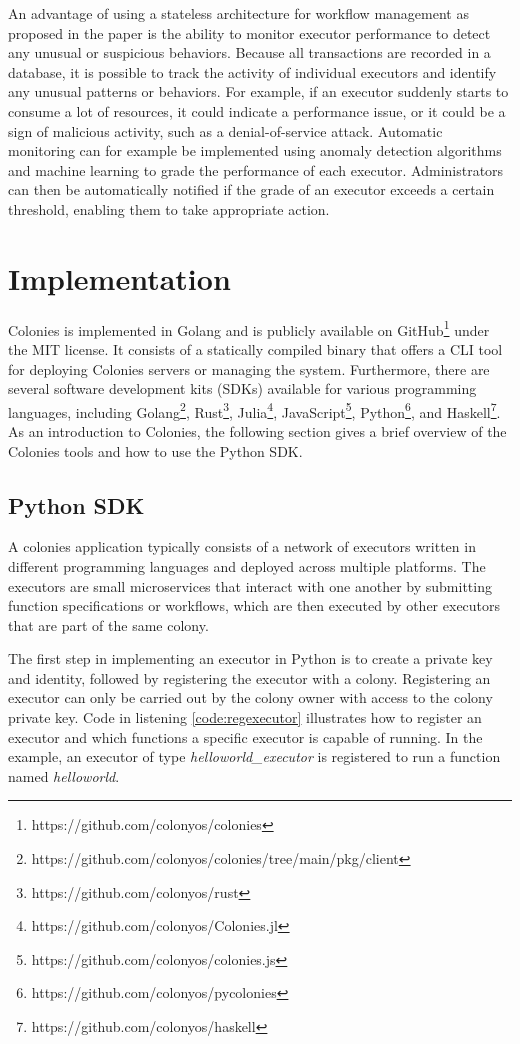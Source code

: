 \documentclass{article}
\begin{document}
An advantage of using a stateless architecture for workflow management as proposed in the paper is the ability to monitor executor performance to detect any unusual or suspicious behaviors. Because all transactions are recorded in a database, it is possible to track the activity of individual executors and identify any unusual patterns or behaviors. For example, if an executor suddenly starts to consume a lot of resources, it could indicate a performance issue, or it could be a sign of malicious activity, such as a denial-of-service attack. Automatic monitoring can for example be implemented using anomaly detection algorithms and machine learning to grade the performance of each executor. Administrators can then be automatically notified if the grade of an executor exceeds a certain threshold, enabling them to take appropriate action.

\section{Implementation}
Colonies is implemented in Golang and is publicly available on GitHub\footnote{https://github.com/colonyos/colonies} under the MIT license. It consists of a statically compiled binary that offers a CLI tool for deploying Colonies servers or managing the system. Furthermore, there are several software development kits (SDKs) available for various programming languages, including Golang\footnote{https://github.com/colonyos/colonies/tree/main/pkg/client}, Rust\footnote{https://github.com/colonyos/rust}, Julia\footnote{https://github.com/colonyos/Colonies.jl}, JavaScript\footnote{https://github.com/colonyos/colonies.js}, Python\footnote{https://github.com/colonyos/pycolonies}, and Haskell\footnote{https://github.com/colonyos/haskell}. As an introduction to Colonies, the following section gives a brief overview of the Colonies tools and how to use the Python SDK.

\subsection{Python SDK}
A colonies application typically consists of a network of executors written in different programming languages and deployed across multiple platforms. The executors are small microservices that interact with one another by submitting function specifications or workflows, which are then executed by other executors that are part of the same colony.

The first step in implementing an executor in Python is to create a private key and identity, followed by registering the executor with a colony. Registering an executor can only be carried out by the colony owner with access to the colony private key. Code in listening \ref{code:regexecutor} illustrates how to register an executor and which functions a specific executor is capable of running. In the example, an executor of type \emph{helloworld\_executor} is registered to run a function named \emph{helloworld}.
\end{document}
